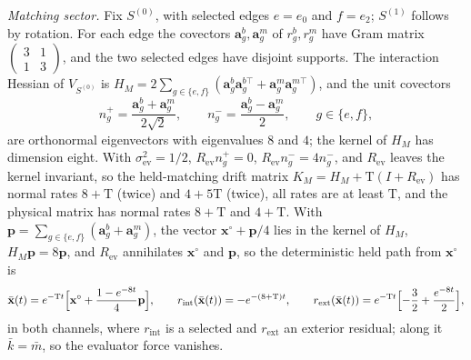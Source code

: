\emph{Matching sector.} Fix \(S^{(0)}\), with selected edges \(e=e_0\) and
\(f=e_2\); \(S^{(1)}\) follows by rotation. For each edge the covectors
\(\mathbf a^b_g,\mathbf a^m_g\) of \(r^b_g,r^m_g\) have Gram matrix
\(\begin{pmatrix}3&1\\1&3\end{pmatrix}\), and the two selected edges have
disjoint supports. The interaction Hessian of \(V_{S^{(0)}}\) is
\(H_M=2\sum_{g\in\{e,f\}}(\mathbf a^b_g\mathbf a^{b\top}_g+\mathbf a^m_g\mathbf a^{m\top}_g)\),
and the unit covectors
\begin{equation}
 n^+_g=\frac{\mathbf a^b_g+\mathbf a^m_g}{2\sqrt2},\qquad
 n^-_g=\frac{\mathbf a^b_g-\mathbf a^m_g}{2},\qquad g\in\{e,f\},
 \label{eq:rg-formation-cycle-normals}
\end{equation}
are orthonormal eigenvectors with eigenvalues \(8\) and \(4\); the kernel of
\(H_M\) has dimension eight. With \(\sigma^2_{\mathrm{ev}}=1/2\),
\(R_{\mathrm{ev}}n^+_g=0\), \(R_{\mathrm{ev}}n^-_g=4n^-_g\), and
\(R_{\mathrm{ev}}\) leaves the kernel invariant, so the held-matching drift
matrix \(K_M=H_M+\mathrm T(I+R_{\mathrm{ev}})\) has normal rates
\(8+\mathrm T\) (twice) and \(4+5\mathrm T\) (twice), all rates are at least
\(\mathrm T\), and the physical matrix has normal rates \(8+\mathrm T\) and
\(4+\mathrm T\). With \(\mathbf p=\sum_{g\in\{e,f\}}(\mathbf a^b_g+\mathbf a^m_g)\),
the vector \(\mathbf x^\circ+\mathbf p/4\) lies in the kernel of \(H_M\),
\(H_M\mathbf p=8\mathbf p\), and \(R_{\mathrm{ev}}\) annihilates \(\mathbf x^\circ\)
and \(\mathbf p\), so the deterministic held path from \(\mathbf x^\circ\) is
\begin{equation}
 \bar{\mathbf x}(t)=e^{-\mathrm Tt}\Bigl[\mathbf x^\circ+\frac{1-e^{-8t}}4\mathbf p\Bigr],
 \qquad
 r_{\mathrm{int}}(\bar{\mathbf x}(t))=-e^{-(8+\mathrm T)t},
 \qquad
 r_{\mathrm{ext}}(\bar{\mathbf x}(t))=e^{-\mathrm Tt}\Bigl[-\frac32+\frac{e^{-8t}}2\Bigr],
 \label{eq:rg-formation-cycle-center}
\end{equation}
in both channels, where \(r_{\mathrm{int}}\) is a selected and
\(r_{\mathrm{ext}}\) an exterior residual; along it \(\bar k=\bar m\), so the
evaluator force vanishes.

